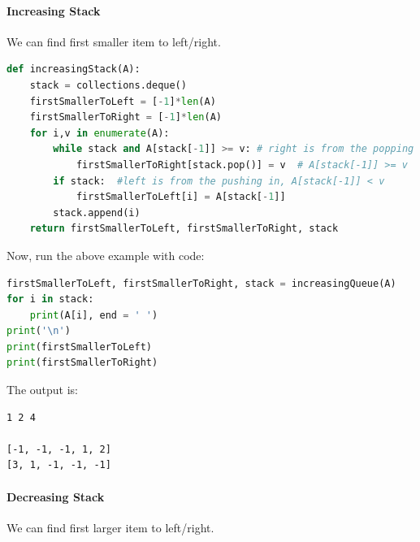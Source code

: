 \documentclass[../main.tex]{subfiles}
\begin{document}
\paragraph{Increasing Stack} We can find first smaller item to left/right.

\begin{lstlisting}[language=Python]
def increasingStack(A):
    stack = collections.deque()
    firstSmallerToLeft = [-1]*len(A)
    firstSmallerToRight = [-1]*len(A)
    for i,v in enumerate(A):
        while stack and A[stack[-1]] >= v: # right is from the popping out
            firstSmallerToRight[stack.pop()] = v  # A[stack[-1]] >= v 
        if stack:  #left is from the pushing in, A[stack[-1]] < v 
            firstSmallerToLeft[i] = A[stack[-1]]
        stack.append(i)
    return firstSmallerToLeft, firstSmallerToRight, stack
\end{lstlisting}
Now, run the above example with code:
\begin{lstlisting}[language=Python]
firstSmallerToLeft, firstSmallerToRight, stack = increasingQueue(A)
for i in stack:
    print(A[i], end = ' ')
print('\n')
print(firstSmallerToLeft)
print(firstSmallerToRight)
\end{lstlisting}
The output is:
\begin{lstlisting}
1 2 4 

[-1, -1, -1, 1, 2]
[3, 1, -1, -1, -1]
\end{lstlisting}

\paragraph{Decreasing Stack} We can find first larger item to left/right.
\end{document}
